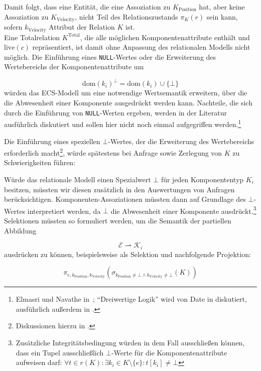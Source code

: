 \noindent
Damit folgt, dass eine Entität, die eine Assoziation zu $K_\text{Position}$ hat, aber keine Assoziation zu $K_\text{Velocity}$, nicht Teil des Relationszustands $\pi_{K}(r)$ sein kann, sofern $k_\text{Velocity}$ Attribut der Relation $K$ ist.\\
Eine Totalrelation $K^\text{Total}$, die alle möglichen Komponentenattribute enthält und $\text{live}(c)$ repräsentiert, ist damit ohne Anpassung des relationalen Modells nicht möglich.
 Die Einführung eines \texttt{NULL}-Wertes oder die Erweiterung des Wertebereichs der Komponentenattribute um

\[
    \text{dom}(k_i)^\bot = \text{dom}(k_i) \cup \{\bot\}
\]
\noindent
würden das ECS-Modell um eine notwendige Wertsemantik erweitern, über die die Abwesenheit einer Komponente ausgedrückt werden kann.
 Nachteile, die sich durch die Einführung von \texttt{NULL}-Werten ergeben, werden in der Literatur ausführlich diskutiert und sollen hier nicht noch einmal aufgegriffen werden.\footnote{
    Elmasri und Navathe in~\cite[S. 306--307]{EN11}; ``Dreiwertige Logik'' wird von Date in \cite[S. 22--29]{Dat95} diskutiert, ausführlich außerdem in \cite[S. 575--600]{Dat03}.
}

Die Einführung eines speziellen $\bot$-Wertes, der die Erweiterung des Wertebereichs erforderlich macht\footnote{
    Diskussionen hierzu in \cite[S. 186--221, S. 229--236]{DDM98}.
}, würde spätestens bei Anfrage sowie Zerlegung von $K$ zu Schwierigkeiten führen:

Würde das relationale Modell einen Spezialwert $\bot$ für jeden Komponententyp $K_i$ besitzen, müssten wir diesen zusätzlich in den Auswertungen von Anfragen berücksichtigen.
Komponenten-Assoziationen müssten dann auf Grundlage des $\bot$-Wertes interpretiert werden, da $\bot$ die Abwesenheit einer Komponente ausdrückt.\footnote{
    Zusätzliche Integritätsbedingung würden in dem Fall ausschließen können, dass ein Tupel ausschließlich $\bot$-Werte für die Komponentenattribute aufweisen darf: $\forall t \in r(K): \exists k_i \in K \setminus \{e\}: t[k_i] \neq \bot$
}
\medskip
Selektionen müssten so formuliert werden, um die Semantik der partiellen Abbildung

\[
    \mathcal{E} \rightharpoonup \mathcal{K}_i
\]
\noindent
 ausdrücken zu können, beispielsweise als Selektion und nachfolgende Projektion:

 \[
     \pi_{e, k_\text{Position}, k_\text{Velocity}}(\sigma_{k_\text{Position} \neq \bot \land k_\text{Velocity} \neq \bot}(K))
 \]


